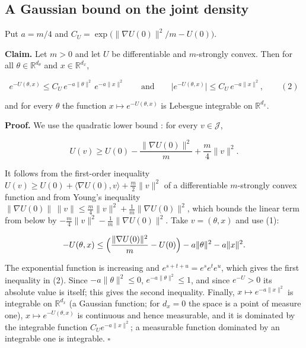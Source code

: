 \documentclass[11pt,a4paper]{report}
\begin{document}
\subsection{\texorpdfstring{A Gaussian bound on the joint density}{A Gaussian bound on the joint density}}
\label{report-step-IPLA-MarginalConcentration-lean-2}


Put \(a=m/4\) and \(C_U=\exp\bigl(\|\nabla U(0)\|^2/m-U(0)\bigr)\).




\textbf{Claim.} Let \(m>0\) and let \(U\) be differentiable and \(m\)-strongly convex. Then for all \(\theta\in\mathbb R^{d_\theta}\) and \(x\in\mathbb R^{d_x}\),


\[e^{-U(\theta,x)}\le C_U\,e^{-a\|\theta\|^2}\,e^{-a\|x\|^2}\qquad\text{and}\qquad\bigl|e^{-U(\theta,x)}\bigr|\le C_U\,e^{-a\|x\|^2},\qquad(2)\]


and for every \(\theta\) the function \(x\mapsto e^{-U(\theta,x)}\) is Lebesgue integrable on \(\mathbb R^{d_x}\).




\textbf{Proof.} We use the quadratic lower bound \cite[Section~3.26.5]{LangevinLean2026ULASC}: for every \(v\in\mathcal J\),


\[U(v)\ge U(0)-\frac{\|\nabla U(0)\|^2}m+\frac m4\|v\|^2 .\]


It follows from the first-order inequality \(U(v)\ge U(0)+\langle\nabla U(0),v\rangle+\frac m2\|v\|^2\) of a differentiable \(m\)-strongly convex function and from Young's inequality \(\|\nabla U(0)\|\,\|v\|\le\frac m4\|v\|^2+\frac1m\|\nabla U(0)\|^2\), which bounds the linear term from below by \(-\frac m4\|v\|^2-\frac1m\|\nabla U(0)\|^2\). Take \(v=(\theta,x)\) and use (1):


\[-U(\theta,x)\le\Bigl(\frac{\|\nabla U(0)\|^2}m-U(0)\Bigr)-a\|\theta\|^2-a\|x\|^2 .\]


The exponential function is increasing and \(e^{s+t+u}=e^se^te^u\), which gives the first inequality in (2). Since \(-a\|\theta\|^2\le0\), \(e^{-a\|\theta\|^2}\le1\), and since \(e^{-U}>0\) its absolute value is itself; this gives the second inequality. Finally, \(x\mapsto e^{-a\|x\|^2}\) is integrable on \(\mathbb R^{d_x}\) (a Gaussian function; for \(d_x=0\) the space is a point of measure one), \(x\mapsto e^{-U(\theta,x)}\) is continuous and hence measurable, and it is dominated by the integrable function \(C_Ue^{-a\|x\|^2}\); a measurable function dominated by an integrable one is integrable. \(\square\)
\end{document}
